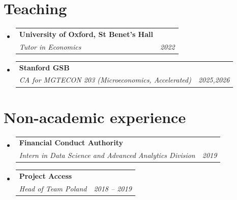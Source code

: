 \documentclass[letterpaper,11pt]{article}
\makeatletter
\newcommand{\resumeSubheading}[3]{
  \vspace{-2pt}\item
    \begin{tabular*}{0.97\textwidth}[t]{l@{\extracolsep{\fill}}r}
      \textbf{#1} \\
      \textit{\small#2} & \textit{\small #3} \\
    \end{tabular*}\vspace{-7pt}
}
\newcommand{\resumeSubHeadingListStart}{\begin{itemize}[leftmargin=0.15in, label={}]}
\newcommand{\resumeSubHeadingListEnd}{\end{itemize}}
\makeatother
\begin{document}
\vspace{0.15cm}

  




\section{Teaching}
  \resumeSubHeadingListStart
     \resumeSubheading
      {University of Oxford, St Benet’s Hall}
      {Tutor in Economics}{2022}
      \resumeSubheading
      {Stanford GSB}
      {CA for MGTECON 203 (Microeconomics, Accelerated)}{2025,2026}
  \resumeSubHeadingListEnd

  \vspace{0.15cm}

\section{Non-academic experience}
  \resumeSubHeadingListStart
      \resumeSubheading
      {Financial Conduct Authority}
      {Intern in Data Science and Advanced Analytics Division}{2019}
    \resumeSubheading
      {Project Access}
      {Head of Team Poland}{2018 -- 2019}
  \resumeSubHeadingListEnd

\vspace{0.15cm}

    
\end{document}
